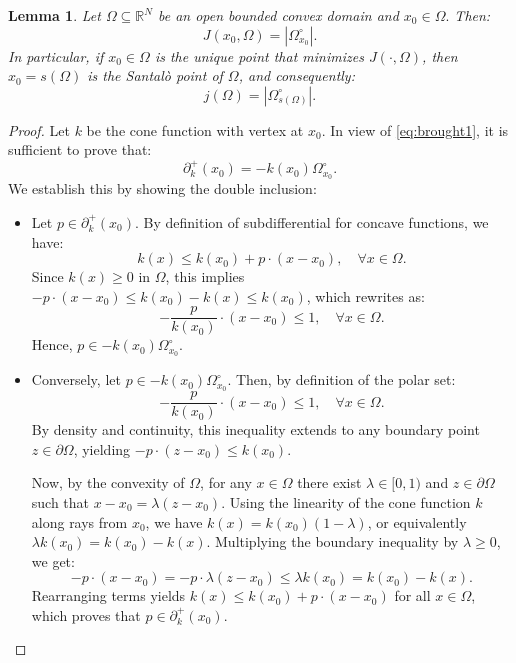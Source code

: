 \documentclass{article}
\newtheorem{lemma}[theorem]{Lemma}
\numberwithin{equation}{section}
\begin{document}
\begin{lemma}
Let $\Omega \subseteq\mathbb{R}^N$ be an open bounded convex domain and $x_0 \in \Omega.$ Then:
\begin{equation}\label{eq:brought2}
J(x_0, \Omega)=|\Omega^\circ_{x_0}|.
\end{equation}
In particular, if $x_0 \in \Omega$ is the unique point that minimizes $J(\cdot, \Omega)$, then $x_0=s(\Omega)$ is the Santalò point of $\Omega$, and consequently:
\begin{equation}\label{eq:brought3}
j(\Omega)=|\Omega^\circ_{s(\Omega)}|.
\end{equation}
\end{lemma}

\begin{proof}
Let $k$ be the cone function with vertex at $x_0$. In view of \eqref{eq:brought1}, it is sufficient to prove that:
\[
\partial^+_k(x_0) = -k(x_0)\Omega^\circ_{x_0}.
\]
We establish this by showing the double inclusion:
\begin{itemize}
    \item[$\mathbf{\subseteq}$:] Let $p \in \partial^+_k(x_0)$. By definition of subdifferential for concave functions, we have:
    \[
    k(x) \leq k(x_0) + p \cdot (x - x_0), \quad \forall x \in \Omega.
    \]
    Since $k(x) \geq 0$ in $\Omega$, this implies $-p \cdot (x - x_0) \leq k(x_0) - k(x) \leq k(x_0)$, which rewrites as:
    \[
    -\frac{p}{k(x_0)} \cdot (x - x_0) \leq 1, \quad \forall x \in \Omega.
    \]
    Hence, $p \in -k(x_0)\Omega^\circ_{x_0}$.
    
    \item[$\mathbf{\supseteq}$:] Conversely, let $p \in -k(x_0)\Omega^\circ_{x_0}$. Then, by definition of the polar set:
    \[
    -\frac{p}{k(x_0)} \cdot (x - x_0) \leq 1, \quad \forall x \in \Omega.
    \]
    By density and continuity, this inequality extends to any boundary point $z \in \partial \Omega$, yielding $-p \cdot (z - x_0) \leq k(x_0)$. 
    
    Now, by the convexity of $\Omega$, for any $x \in \Omega$ there exist $\lambda \in [0,1)$ and $z \in \partial \Omega$ such that $x - x_0 = \lambda(z - x_0)$. Using the linearity of the cone function $k$ along rays from $x_0$, we have $k(x) = k(x_0)(1 - \lambda)$, or equivalently $\lambda k(x_0) = k(x_0) - k(x)$. Multiplying the boundary inequality by $\lambda \geq 0$, we get:
    \[
    -p \cdot (x - x_0) = -p \cdot \lambda(z - x_0) \leq \lambda k(x_0) = k(x_0) - k(x).
    \]
    Rearranging terms yields $k(x) \leq k(x_0) + p \cdot (x - x_0)$ for all $x \in \Omega$, which proves that $p \in \partial^+_k(x_0)$.
\end{itemize}


\end{proof}
\end{document}
